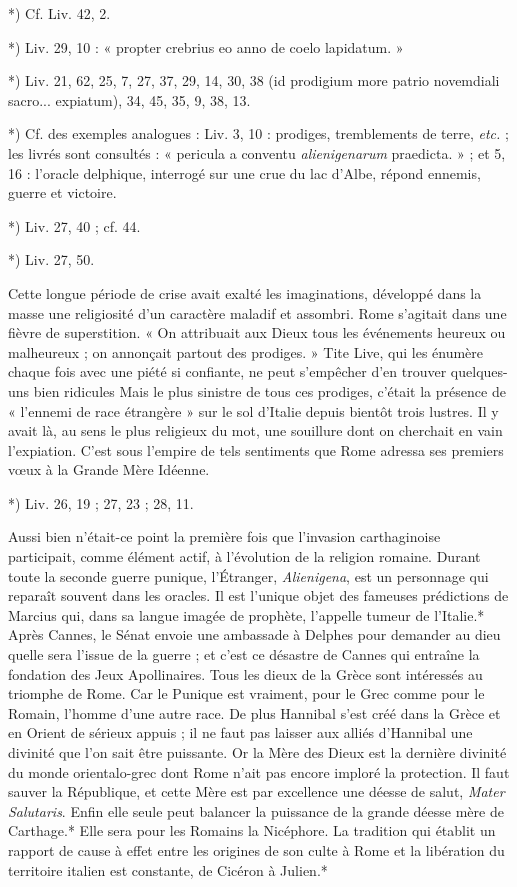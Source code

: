 \documentclass[a4paper, 11pt, oneside, polutonikogreek, french]{article}
\begin{document}
*) Cf. Liv. 42, 2.

*) Liv. 29, 10 : « propter crebrius eo anno de coelo lapidatum. »

*) Liv. 21, 62, 25, 7, 27, 37,  29, 14, 30, 38 (id prodigium more patrio novemdiali sacro... expiatum), 34, 45, 35, 9, 38, 13.

*) Cf. des exemples analogues : Liv. 3, 10 : prodiges, tremblements de terre, \emph{etc.} ; les livrés sont consultés : « pericula a conventu \emph{alienigenarum} praedicta. » ; et 5, 16 : l'oracle delphique, interrogé sur une crue du lac d'Albe, répond ennemis, guerre et victoire.

*) Liv. 27, 40 ; cf. 44.

*) Liv. 27, 50.

Cette longue période de crise avait exalté les imaginations, développé dans la masse une religiosité d'un caractère maladif et assombri. Rome s'agitait dans une fièvre de superstition. « On attribuait aux Dieux tous les événements heureux ou malheureux ; on annonçait partout des prodiges. » Tite Live, qui les énumère chaque fois avec une piété si confiante, ne peut s'empêcher d'en trouver quelques-uns bien ridicules Mais le plus sinistre de tous ces prodiges, c'était la présence de « l'ennemi de race étrangère » sur le sol d'Italie depuis bientôt trois lustres. Il y avait là, au sens le plus religieux du mot, une souillure dont on cherchait en vain l'expiation. C'est sous l'empire de tels sentiments que Rome adressa ses premiers vœux à la Grande Mère Idéenne.

*) Liv. 26, 19 ; 27, 23 ; 28, 11.

Aussi bien n'était-ce point la première fois que l'invasion carthaginoise participait, comme élément actif, à l'évolution de la religion romaine. Durant toute la seconde guerre punique, l'Étranger, \emph{Alienigena}, est un personnage qui reparaît souvent dans les oracles. Il est l'unique objet des fameuses prédictions de Marcius qui, dans sa langue imagée de prophète, l'appelle tumeur de l'Italie.* Après Cannes, le Sénat envoie une ambassade à Delphes pour demander au dieu quelle sera l'issue de la guerre ; et c'est ce désastre de Cannes qui entraîne la fondation des Jeux Apollinaires. Tous les dieux de la Grèce sont intéressés au triomphe de Rome. Car le Punique est vraiment, pour le Grec comme pour le Romain, l'homme d'une autre race. De plus Hannibal s'est créé dans la Grèce et en Orient de sérieux appuis ; il ne faut pas laisser aux alliés d'Hannibal une divinité que l'on sait être puissante. Or la Mère des Dieux est la dernière divinité du monde orientalo-grec dont Rome n'ait pas encore imploré la protection. Il faut sauver la République, et cette Mère est par excellence une déesse de salut, \emph{Mater Salutaris}. Enfin elle seule peut balancer la puissance de la grande déesse mère de Carthage.* Elle sera pour les Romains la Nicéphore. La tradition qui établit un rapport de cause à effet entre les origines de son culte à Rome et la libération du territoire italien est constante, de Cicéron à Julien.*
\end{document}
